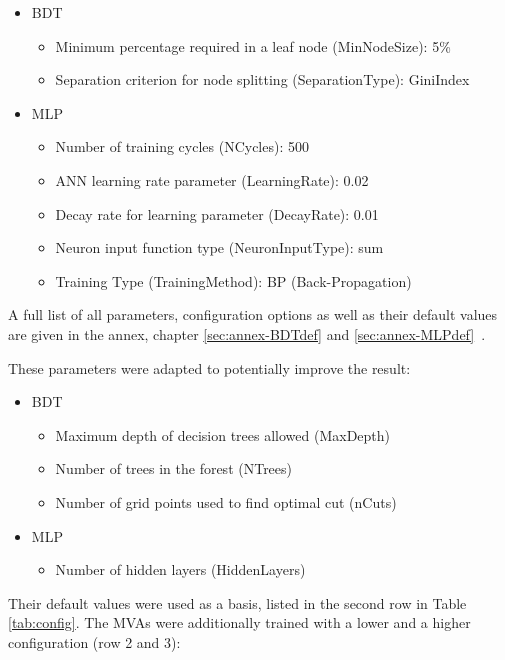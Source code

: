 \documentclass[11pt]{scrartcl}
\begin{document}
		\begin{itemize}
  			\item BDT
  					\begin{itemize}
  					\item Minimum percentage required in a leaf node (MinNodeSize): 5\%
  					\item Separation criterion for node splitting (SeparationType): GiniIndex
  					\end{itemize}
  		  	\item MLP
  					\begin{itemize}
  					\item Number of training cycles (NCycles): 500
  					\item ANN learning rate parameter (LearningRate): 0.02
  					\item Decay rate for learning parameter (DecayRate): 0.01
  					\item Neuron input function type (NeuronInputType): sum
  					\item Training Type (TrainingMethod): BP (Back-Propagation)
  					\end{itemize}		
		\end{itemize}
		
	A full list of all parameters, configuration options as well as their default values are given in the annex, chapter \ref{sec:annex-BDTdef} and \ref{sec:annex-MLPdef}~\cite{TMVA}.
	
	These parameters were adapted to potentially improve the result:
		\begin{itemize}
  			\item BDT
  					\begin{itemize}
  					\item Maximum depth of decision trees allowed (MaxDepth)
  					\item Number of trees in the forest (NTrees)
  					\item Number of grid points used to find optimal cut (nCuts)
  					\end{itemize}
  		  	\item MLP
  					\begin{itemize}
  					\item Number of hidden layers (HiddenLayers)
  					\end{itemize}		
		\end{itemize}
		
	Their default values were used as a basis, listed in the second row in Table \ref{tab:config}. The MVAs were additionally trained with a lower and a higher configuration (row 2 and 3):
	
\end{document}
